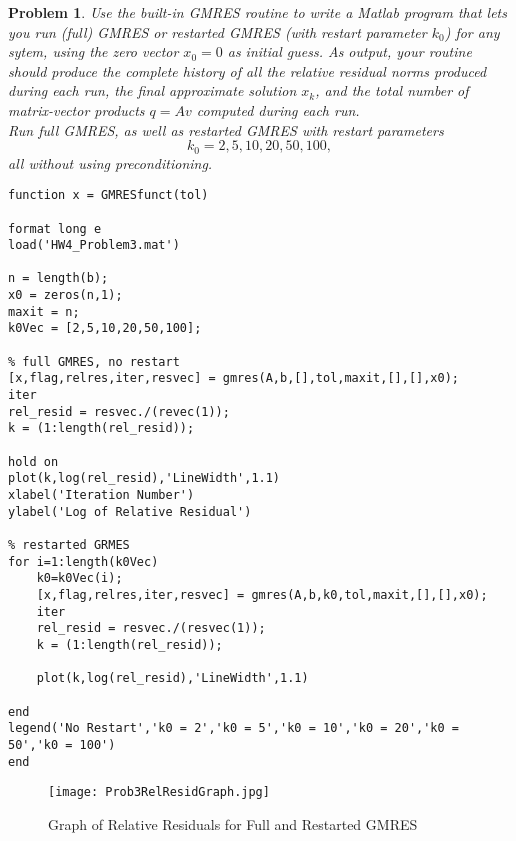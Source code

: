 \documentclass[12pt]{article}
\newtheorem{problem}{Problem}
\begin{document}
\bigskip\bigskip
\noindent
\begin{problem} Use the built-in GMRES routine to write a Matlab program that lets you run (full) GMRES or restarted GMRES (with restart parameter $k_0$) for any sytem, using the zero vector $x_0 = 0$ as initial guess.  As output, your routine should produce the complete history of all the relative residual norms produced during each run, the final approximate solution $x_k$, and the total number of matrix-vector products $q=Av$ computed during each run.\\
Run full GMRES, as well as restarted GMRES with restart parameters
$$k_0 = 2, 5, 10, 20, 50, 100,$$
all without using preconditioning.
\end{problem}
\newpage
\lstset{language=matlab,frame=single}
\begin{lstlisting}[caption=Function to Run Full and Restarted GMRES]
function x = GMRESfunct(tol)

format long e
load('HW4_Problem3.mat')

n = length(b);
x0 = zeros(n,1);
maxit = n;
k0Vec = [2,5,10,20,50,100];

% full GMRES, no restart
[x,flag,relres,iter,resvec] = gmres(A,b,[],tol,maxit,[],[],x0);
iter
rel_resid = resvec./(revec(1));
k = (1:length(rel_resid));

hold on
plot(k,log(rel_resid),'LineWidth',1.1)
xlabel('Iteration Number')
ylabel('Log of Relative Residual')
    
% restarted GRMES   
for i=1:length(k0Vec)
    k0=k0Vec(i);
    [x,flag,relres,iter,resvec] = gmres(A,b,k0,tol,maxit,[],[],x0);
    iter
    rel_resid = resvec./(resvec(1));
    k = (1:length(rel_resid));
    
    plot(k,log(rel_resid),'LineWidth',1.1)
    
end
legend('No Restart','k0 = 2','k0 = 5','k0 = 10','k0 = 20','k0 = 50','k0 = 100')
end
\end{lstlisting}

\begin{figure}[H]
\hspace{-.1in}
\texttt{[image: Prob3RelResidGraph.jpg]}
\caption{Graph of Relative Residuals for Full and Restarted GMRES}
\end{figure}
\end{document}
